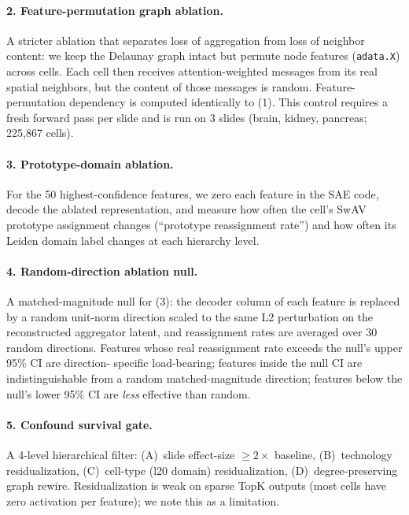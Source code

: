 \documentclass[11pt]{article}
\begin{document}
\paragraph{2. Feature-permutation graph ablation.}
A stricter ablation that separates loss of aggregation from loss of
neighbor content: we keep the Delaunay graph intact but permute node
features (\texttt{adata.X}) across cells. Each cell then receives
attention-weighted messages from its real spatial neighbors, but the
content of those messages is random. Feature-permutation dependency
is computed identically to (1). This control requires a fresh forward
pass per slide and is run on 3 slides (brain, kidney, pancreas;
225{,}867 cells).

\paragraph{3. Prototype-domain ablation.}
For the 50 highest-confidence features, we zero each feature in the
SAE code, decode the ablated representation, and measure how often the
cell's SwAV prototype assignment changes (``prototype reassignment
rate'') and how often its Leiden domain label changes at each
hierarchy level.

\paragraph{4. Random-direction ablation null.}
A matched-magnitude null for (3): the decoder column of each feature
is replaced by a random unit-norm direction scaled to the same L2
perturbation on the reconstructed aggregator latent, and reassignment
rates are averaged over 30 random directions. Features whose real
reassignment rate exceeds the null's upper 95\% CI are direction-
specific load-bearing; features inside the null CI are
indistinguishable from a random matched-magnitude direction; features
below the null's lower 95\% CI are \emph{less} effective than random.

\paragraph{5. Confound survival gate.}
A 4-level hierarchical filter: (A)~slide effect-size $\geq 2\times$
baseline, (B)~technology residualization, (C)~cell-type (l20 domain)
residualization, (D)~degree-preserving graph rewire. Residualization
is weak on sparse TopK outputs (most cells have zero activation per
feature); we note this as a limitation.
\end{document}

